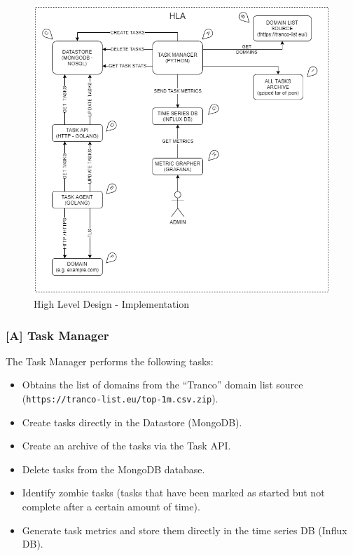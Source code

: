 \documentclass{mscreport}
\begin{document}
\begin{figure}[h!]
	\begin{center}
		\includegraphics[scale=0.65]{../images/HLA_Implementation_v1_Entites.png} 
		\caption{High Level Design - Implementation}
		\label{fig:hla_design_implmementation}
	\end{center}
\end{figure}

\clearpage

\newpage

\subsubsection{[A] Task Manager}

The Task Manager performs the following tasks:

\begin{itemize}
	\setlength\itemsep{0.1em}
    \item Obtains the list of domains from the ``Tranco'' domain list source \newline (\texttt{https://tranco-list.eu/top-1m.csv.zip}).
    \item Create tasks directly in the Datastore (MongoDB).
    \item Create an archive of the tasks via the Task API.
    \item Delete tasks from the MongoDB database.
    \item Identify zombie tasks (tasks that have been marked as started but not complete after a certain amount of time).
    \item Generate task metrics and store them directly in the time series DB (Influx DB).
\end{itemize}
\end{document}
